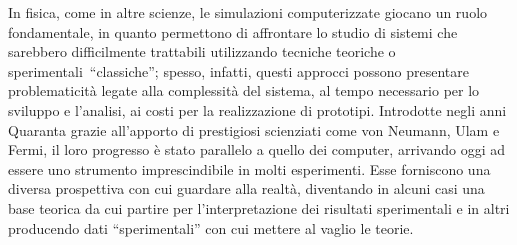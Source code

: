 In fisica, come in altre scienze, le simulazioni computerizzate giocano un ruolo fondamentale, in quanto permettono di affrontare lo studio di sistemi che sarebbero difficilmente trattabili utilizzando tecniche teoriche o sperimentali~``classiche'';
spesso, infatti, questi approcci possono presentare problematicità legate alla complessità del sistema, al tempo necessario per lo sviluppo e l'analisi, ai costi per la realizzazione di prototipi.
Introdotte negli anni Quaranta grazie all'apporto di prestigiosi scienziati come von Neumann, Ulam e Fermi, il loro progresso è stato parallelo a quello dei computer, arrivando oggi ad essere uno strumento imprescindibile in molti esperimenti.
Esse forniscono una diversa prospettiva con cui guardare alla realtà, diventando in alcuni casi una base teorica da cui partire per l'interpretazione dei risultati sperimentali e in altri producendo dati ``sperimentali'' con cui mettere al vaglio le teorie.

